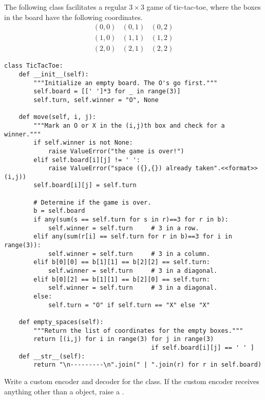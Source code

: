\begin{problem}
The following class facilitates a regular $3\times 3$ game of tic-tac-toe, where the boxes in the board have the following coordinates.
\[
\begin{array}{c|c|c}
(0,0) & (0,1) & (0,2) \\ \hline
(1,0) & (1,1) & (1,2) \\ \hline
(2,0) & (2,1) & (2,2)
\end{array}
\]
\begin{lstlisting}
class TicTacToe:
    def __init__(self):
        """Initialize an empty board. The O's go first."""
        self.board = [[' ']*3 for _ in range(3)]
        self.turn, self.winner = "O", None

    def move(self, i, j):
        """Mark an O or X in the (i,j)th box and check for a winner."""
        if self.winner is not None:
            raise ValueError("the game is over!")
        elif self.board[i][j] != ' ':
            raise ValueError("space ({},{}) already taken".<<format>>(i,j))
        self.board[i][j] = self.turn

        # Determine if the game is over.
        b = self.board
        if any(sum(s == self.turn for s in r)==3 for r in b):
            self.winner = self.turn     # 3 in a row.
        elif any(sum(r[i] == self.turn for r in b)==3 for i in range(3)):
            self.winner = self.turn     # 3 in a column.
        elif b[0][0] == b[1][1] == b[2][2] == self.turn:
            self.winner = self.turn     # 3 in a diagonal.
        elif b[0][2] == b[1][1] == b[2][0] == self.turn:
            self.winner = self.turn     # 3 in a diagonal.
        else:
            self.turn = "O" if self.turn == "X" else "X"

    def empty_spaces(self):
        """Return the list of coordinates for the empty boxes."""
        return [(i,j) for i in range(3) for j in range(3)
                                        if self.board[i][j] == ' ' ]
    def __str__(self):
        return "\n---------\n".join(" | ".join(r) for r in self.board)
\end{lstlisting}

Write a custom encoder and decoder for the  class.
If the custom encoder receives anything other than a  object, raise a .
\label{prob:tictactoe-serialization}
\end{problem}

